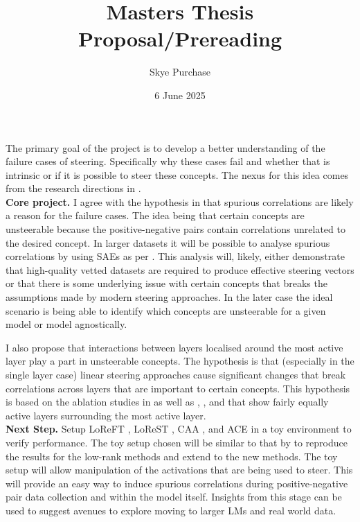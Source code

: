 \documentclass[]{article}
\title{Masters Thesis Proposal/Prereading}
\author{Skye Purchase}
\date{6 June 2025}
\begin{document}
\maketitle

The primary goal of the project is to develop a better understanding of the failure cases of steering.
Specifically why these cases fail and whether that is intrinsic or if it is possible to steer these concepts.
The nexus for this idea comes from the research directions in \cite{steering-taxonomy}. \\

\textbf{Core project.}
I agree with the hypothesis in \cite{steering-taxonomy} that spurious correlations are likely a reason for the failure cases.
The idea being that certain concepts are unsteerable \cite{steerability} because the positive-negative pairs contain correlations unrelated to the desired concept.
In larger datasets it will be possible to analyse spurious correlations by using SAEs as per \cite{dataset_debugging_with_SAEs}.
This analysis will, likely, either demonstrate that high-quality vetted datasets are required to produce effective steering vectors or that there is some underlying issue with certain concepts that breaks the assumptions made by modern steering approaches.
In the later case the ideal scenario is being able to identify which concepts are unsteerable for a given model or model agnostically.

I also propose that interactions between layers localised around the most active layer play a part in unsteerable concepts. The hypothesis is that (especially in the single layer case) linear steering approaches cause significant changes that break correlations across layers that are important to certain concepts. This hypothesis is based on the ablation studies in \cite{steerability} as well as \cite{conceptors}, \cite{function-vectors}, and \cite{steering-theory} that show fairly equally active layers surrounding the most active layer. \\

\textbf{Next Step.}
Setup LoReFT \cite{reft}, LoReST \cite{steering-theory}, CAA \cite{caa}, and ACE \cite{ACE} in a toy environment to verify performance.
The toy setup chosen will be similar to that by \cite{steering-theory} to reproduce the results for the low-rank methods and extend to the new methods.
The toy setup will allow manipulation of the activations that are being used to steer.
This will provide an easy way to induce spurious correlations during positive-negative pair data collection and within the model itself.
Insights from this stage can be used to suggest avenues to explore moving to larger LMs and real world data.

\printbibliography
\end{document}
